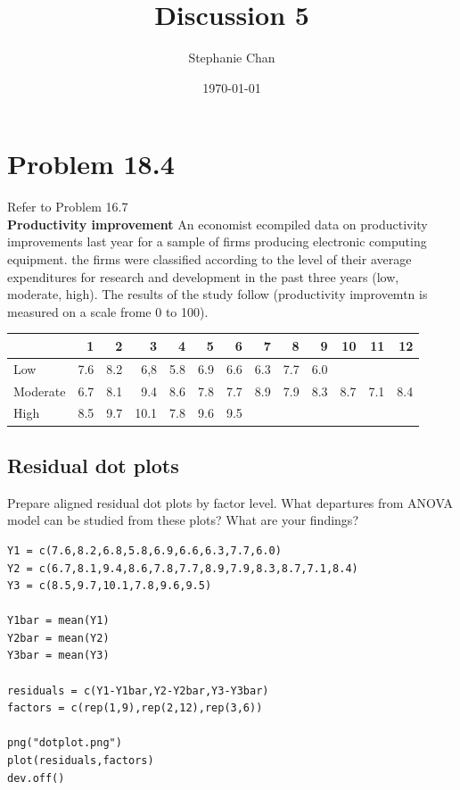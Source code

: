 \documentclass[11pt]{article}
\title{Discussion 5}
\author{Stephanie Chan}
\date{\today}
\begin{document}
\maketitle


\section{Problem 18.4}
\label{sec-1}

  Refer to Problem 16.7\\
\textbf{Productivity improvement} An economist ecompiled data on productivity
improvements last year for a sample of firms producing electronic
computing equipment.  the firms were classified according to the
level of their average expenditures for research and development in
the past three years (low, moderate, high).  The results of the study
follow (productivity improvemtn is measured on a scale frome 0 to
100).

\begin{center}
\begin{tabular}{lrrrrrrrrrrrr}
\hline
           &    1  &    2  &     3  &    4  &    5  &    6  &    7  &    8  &    9  &   10  &   11  &   12  \\
\hline
 Low       &  7.6  &  8.2  &   6,8  &  5.8  &  6.9  &  6.6  &  6.3  &  7.7  &  6.0  &       &       &       \\
 Moderate  &  6.7  &  8.1  &   9.4  &  8.6  &  7.8  &  7.7  &  8.9  &  7.9  &  8.3  &  8.7  &  7.1  &  8.4  \\
 High      &  8.5  &  9.7  &  10.1  &  7.8  &  9.6  &  9.5  &       &       &       &       &       &       \\
\hline
\end{tabular}
\end{center}
\subsection{Residual dot plots}
\label{sec-1-1}

Prepare aligned residual dot plots by factor level.  What departures
from ANOVA model can be studied from these plots?  What are your
findings?


\begin{verbatim}
Y1 = c(7.6,8.2,6.8,5.8,6.9,6.6,6.3,7.7,6.0)
Y2 = c(6.7,8.1,9.4,8.6,7.8,7.7,8.9,7.9,8.3,8.7,7.1,8.4)
Y3 = c(8.5,9.7,10.1,7.8,9.6,9.5)

Y1bar = mean(Y1)
Y2bar = mean(Y2)
Y3bar = mean(Y3)

residuals = c(Y1-Y1bar,Y2-Y2bar,Y3-Y3bar)
factors = c(rep(1,9),rep(2,12),rep(3,6))

png("dotplot.png")
plot(residuals,factors)
dev.off()
\end{verbatim}
\end{document}
